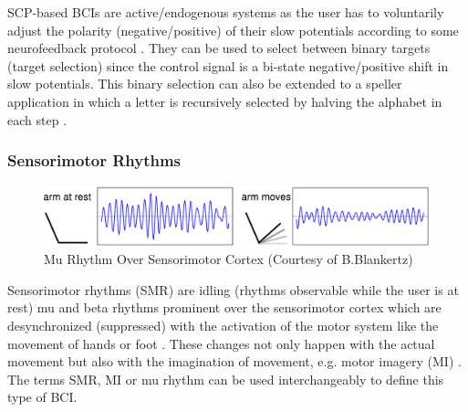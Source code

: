 \documentclass[12pt]{article}
\newcommand\mysubsubsection[1]{\subsubsection{#1}}
\numberwithin{equation}{section}
\numberwithin{figure}{section}
\numberwithin{table}{section}
\begin{document}
\par{
    SCP-based BCIs are active/endogenous systems as the user has to voluntarily adjust
    the polarity (negative/positive) of their slow potentials according to some neurofeedback protocol \citep{jackson_neural_2010}.
    They can be used to select between binary targets (target selection) since the control signal is a bi-state
    negative/positive shift in slow potentials. This binary selection can also be extended
    to a speller application in which a letter is recursively selected by halving
    the alphabet in each step \citep{birbaumer_thought_2000}.
}

\mysubsubsection{Sensorimotor Rhythms}
\par{
    \begin{figure}[ht]
        \centering
        \includegraphics[scale=0.7]{images/motor_imagery}
        \caption[Mu Rhythm Over Sensorimotor Cortex]{Mu Rhythm Over Sensorimotor Cortex (Courtesy of B.Blankertz)}
        \label{fig:eeg_motor_imagery}
    \end{figure}

    Sensorimotor rhythms (SMR) are idling (rhythms observable while the
    user is at rest) mu and beta rhythms prominent over the sensorimotor cortex which are desynchronized
    (suppressed) with the activation of the motor system like the movement
    of hands or foot \citep{sellers_bcis_2010}. These changes not only happen
    with the actual movement but also with the imagination of movement, e.g. motor imagery (MI) \citep{mcfarland_braincomputer_2006}.
    The terms SMR, MI or mu rhythm can be used interchangeably to define this
    type of BCI.
}
\newpage
\end{document}
